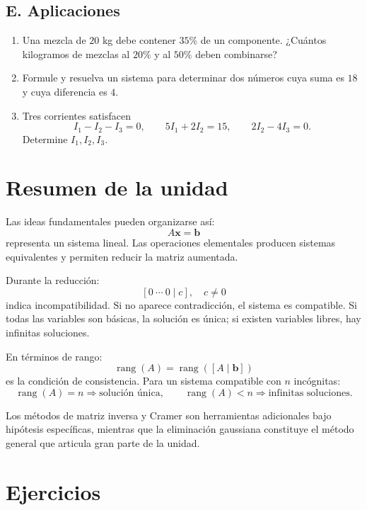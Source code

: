 \documentclass[12pt]{article}
\theoremstyle{remark}
\newcommand{\rank}{\operatorname{rang}}
\begin{document}
\subsection*{E. Aplicaciones}
\begin{enumerate}
\item Una mezcla de $20$ kg debe contener $35\%$ de un componente. ¿Cuántos kilogramos de mezclas
al $20\%$ y al $50\%$ deben combinarse?
\item Formule y resuelva un sistema para determinar dos números cuya suma es $18$ y cuya diferencia
es $4$.
\item Tres corrientes satisfacen
\[
I_1-I_2-I_3=0,\qquad 5I_1+2I_2=15,\qquad 2I_2-4I_3=0.
\]
Determine $I_1,I_2,I_3$.
\end{enumerate}

\section{Resumen de la unidad}

Las ideas fundamentales pueden organizarse así:
\[
A\mathbf x=\mathbf b
\]
representa un sistema lineal. Las operaciones elementales producen sistemas equivalentes y permiten
reducir la matriz aumentada.

Durante la reducción:
\[
[0\ \cdots\ 0\mid c],\quad c\neq0
\]
indica incompatibilidad. Si no aparece contradicción, el sistema es compatible. Si todas las variables
son básicas, la solución es única; si existen variables libres, hay infinitas soluciones.

En términos de rango:
\[
\boxed{\rank(A)=\rank([A\mid\mathbf b])}
\]
es la condición de consistencia. Para un sistema compatible con $n$ incógnitas:
\[
\rank(A)=n\Longrightarrow\text{solución única},
\qquad
\rank(A)<n\Longrightarrow\text{infinitas soluciones}.
\]

Los métodos de matriz inversa y Cramer son herramientas adicionales bajo hipótesis específicas, mientras
que la eliminación gaussiana constituye el método general que articula gran parte de la unidad.

\section{Ejercicios}
\end{document}
